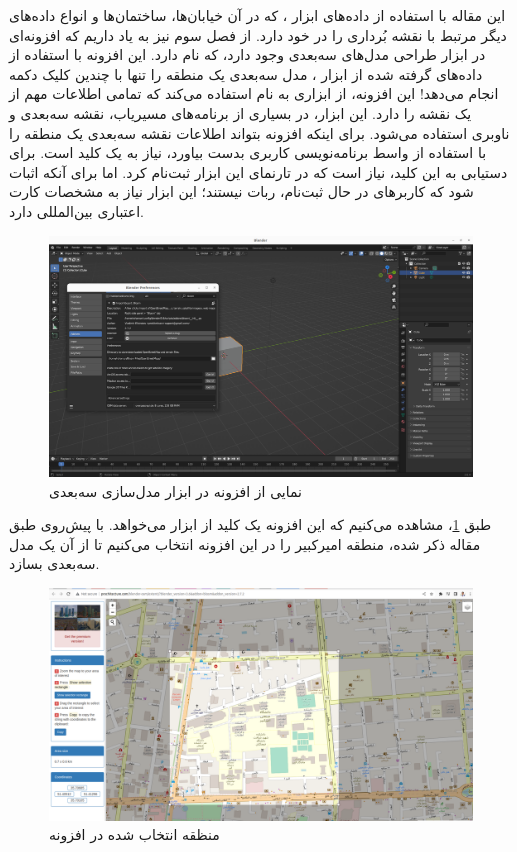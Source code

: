 این مقاله با استفاده از داده‌های ابزار ، که در آن خیابان‌ها، ساختمان‌ها و انواع داده‌های دیگر مرتبط با نقشه بُرداری را در خود دارد. از فصل سوم نیز به یاد داریم که افزونه‌ای در ابزار طراحی مدل‌های سه‌بعدی  وجود دارد، که  نام دارد. این افزونه با استفاده از داده‌های  گرفته شده از ابزار ، مدل سه‌بعدی یک منطقه را تنها با چندین کلیک دکمه انجام می‌دهد! این افزونه، از ابزاری به نام  استفاده می‌کند که تمامی اطلاعات مهم از یک نقشه را دارد. این ابزار، در بسیاری از برنامه‌های مسیریاب، نقشه سه‌بعدی و ناوبری استفاده می‌شود. برای اینکه افزونه  بتواند اطلاعات نقشه سه‌بعدی یک منطقه را با استفاده از واسط برنامه‌نویسی کاربری  بدست بیاورد، نیاز به یک کلید  است. برای دستیابی به این کلید، نیاز است که در تارنمای این ابزار ثبت‌نام کرد. اما برای آنکه اثبات شود که کاربرهای در حال ثبت‌نام، ربات نیستند؛ این ابزار نیاز به مشخصات کارت اعتباری بین‌المللی دارد.
\begin{figure}[h!]
    \centering
    \includegraphics[width=0.9\linewidth]{figures/Blender_Blosm.png}
    \caption{نمایی از افزونه  در ابزار مدل‌سازی سه‌بعدی }
    \label{fig:Blender_Blosm}
\end{figure}
طبق \cref{fig:Blender_Blosm}، مشاهده می‌کنیم که این افزونه یک کلید  از ابزار  می‌خواهد. با پیش‌روی طبق مقاله ذکر شده، منطقه امیرکبیر را در این افزونه انتخاب می‌کنیم تا از آن یک مدل سه‌بعدی بسازد. 
\begin{figure}[h!]
    \centering
    \includegraphics[width=0.9\linewidth]{figures/Blosm_OSM.png}
    \caption{منظقه انتخاب شده در افزونه }
    \label{fig:Blosm_OSM}
\end{figure}
